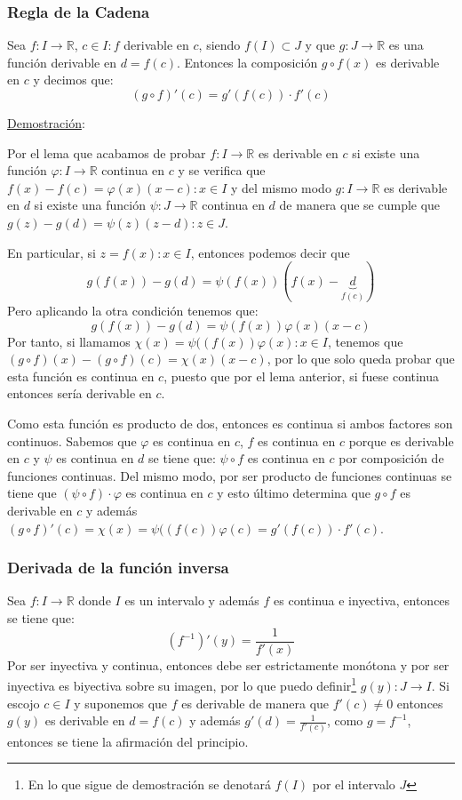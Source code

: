 \documentclass[10pt,a4paper,openright]{book}
\begin{document}
\subsubsection*{Regla de la Cadena}
Sea $f: I \rightarrow \mathbb R $, $c\in I: f$ derivable en $c$, siendo $f(I)\subset J$ y que $g: J\rightarrow \mathbb R$ es una función derivable en $d=f(c)$. Entonces la composición $g\circ f (x)$ es derivable en $c$ y decimos que:
$$(g\circ f)'(c)=g'(f(c))\cdot f'(c)$$

\underline{Demostración}:

Por el lema que acabamos de probar $f: I\rightarrow \mathbb R$ es derivable en $c$ si existe una función $\varphi: I\rightarrow \mathbb R$ continua en $c$ y se verifica que $f(x)-f(c)=\varphi(x)(x-c): x\in I$ y del mismo modo $g: I\rightarrow \mathbb R$ es derivable en $d$ si existe una función $\psi: J\rightarrow \mathbb R$ continua en $d$ de manera que se cumple que $g(z)-g(d)=\psi(z)(z-d): z\in J$.

En particular, si $z= f(x): x\in I$, entonces podemos decir que
$$g(f(x))-g(d)=\psi(f(x))(f(x)-\underbrace{d}_{f(c)})$$
Pero aplicando la otra condición tenemos que:
$$g(f(x))-g(d)=\psi(f(x))\varphi(x)(x-c)$$
Por tanto, si llamamos $\chi(x)= \psi((f(x))\varphi(x): x\in I$, tenemos que $(g\circ f)(x)-(g\circ f)(c)=\chi(x)(x-c)$, por lo que solo queda probar que esta función es continua en $c$, puesto que por el lema anterior, si fuese continua entonces sería derivable en $c$.

Como esta función es producto de dos, entonces es continua si ambos factores son continuos. Sabemos que $\varphi$ es continua en $c$, $f$ es continua en $c$ porque es derivable en $c$ y $\psi$ es continua en $d$ se tiene que: $\psi \circ f$ es continua en $c$ por composición de funciones continuas. Del mismo modo, por ser producto de funciones continuas se tiene que $(\psi \circ f)\cdot \varphi$ es continua en $c$ y esto último determina que $g\circ f$ es derivable en $c$ y además $(g\circ f)'(c)=\chi(x)= \psi((f(c))\varphi(c)=g'(f(c))\cdot f'(c)$.

\subsubsection*{Derivada de la función inversa}
Sea $f:I\rightarrow \mathbb R$ donde $I$ es un intervalo y además $f$ es continua e inyectiva, entonces se tiene que:
$$(f^{-1})'(y)=\frac{1}{f'(x)}$$
Por ser inyectiva y continua, entonces debe ser estrictamente monótona y por ser inyectiva es biyectiva sobre su imagen, por lo que puedo definir\footnote{En lo que sigue de demostración se denotará $f(I)$ por el intervalo $J$} $g(y): J\rightarrow I$.  Si escojo $c\in I$ y suponemos que $f$ es derivable de manera que $f'(c)\neq 0$  entonces $g(y)$ es derivable en $d=f(c)$ y además $g'(d)=\frac{1}{f'(c)}$, como $g=f^{-1}$, entonces se tiene la afirmación del principio.
\end{document}

